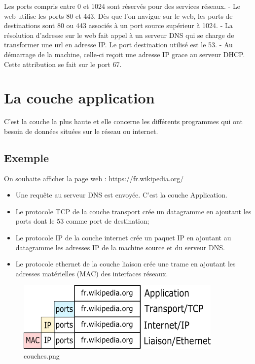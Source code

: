 \documentclass[11pt]{article}
\providecommand{\tightlist}{%
      \setlength{\itemsep}{0pt}\setlength{\parskip}{0pt}}
\begin{document}
Les ports compris entre 0 et 1024 sont réservés pour des services
réseaux. - Le web utilise les ports 80 et 443. Dès que l'on navigue sur
le web, les ports de destinations sont 80 ou 443 associés à un port
source supérieur à 1024. - La résolution d'adresse sur le web fait appel
à un serveur DNS qui se charge de transformer une url en adresse IP. Le
port destination utilisé est le 53. - Au démarrage de la machine,
celle-ci reçoit une adresse IP grace au serveur DHCP. Cette attribution
se fait sur le port 67.

    \hypertarget{la-couche-application}{%
\section{La couche application}\label{la-couche-application}}

C'est la couche la plus haute et elle concerne les différents programmes
qui ont besoin de données situées sur le réseau ou internet.

\hypertarget{exemple}{%
\subsection{Exemple}\label{exemple}}

On souhaite afficher la page web : https://fr.wikipedia.org/

\begin{itemize}
\tightlist
\item
  Une requête au serveur DNS est envoyée. C'est la couche Application.
\item
  Le protocole TCP de la couche transport crée un datagramme en ajoutant
  les ports dont le 53 comme port de destination;
\item
  Le protocole IP de la couche internet crée un paquet IP en ajoutant au
  datagramme les adresses IP de la machine source et du serveur DNS.
\item
  Le protocole ethernet de la couche liaison crée une trame en ajoutant
  les adresses matérielles (MAC) des interfaces réseaux.
\end{itemize}

    \begin{figure}
\centering
\includegraphics{img/couches.png}
\caption{couches.png}
\end{figure}


    
    
    
\end{document}
